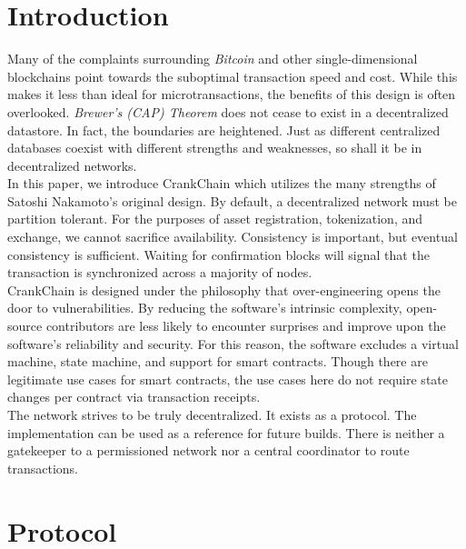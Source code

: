 \documentclass[10pt,twocolumn]{article}
\begin{document}
\section{Introduction}
Many of the complaints surrounding \textit{Bitcoin} and other single-dimensional blockchains point towards the suboptimal transaction speed and cost\cite{wiki:btcscalability}.  While this makes it less than ideal for microtransactions, the benefits of this design is often overlooked.  \textit{Brewer's (CAP) Theorem}\cite{computer:brewercap} does not cease to exist in a decentralized datastore.  In fact, the boundaries are heightened.  Just as different centralized databases coexist with different strengths and weaknesses, so shall it be in decentralized networks.\\
In this paper, we introduce CrankChain which utilizes the many strengths of Satoshi Nakamoto's original design\cite{conf:nakamoto}.  By default, a decentralized network must be partition tolerant.  For the purposes of asset registration, tokenization, and exchange, we cannot sacrifice availability.  Consistency is important, but eventual consistency is sufficient.  Waiting for confirmation blocks will signal that the transaction is synchronized across a majority of nodes.  \\
CrankChain is designed under the philosophy that over-engineering opens the door to vulnerabilities.  By reducing the software's intrinsic complexity, open-source contributors are less likely to encounter surprises and improve upon the software's reliability and security.  For this reason, the software excludes a virtual machine, state machine, and support for smart contracts.  Though there are legitimate use cases for smart contracts\cite{whitepaper:buterin}, the use cases here do not require state changes per contract via transaction receipts\cite{yellow:wood}.  \\
The network strives to be truly decentralized.  It exists as a protocol.  The implementation can be used as a reference for future builds.  There is neither a gatekeeper to a permissioned network nor a central coordinator to route transactions.


\section{Protocol}
\end{document}
